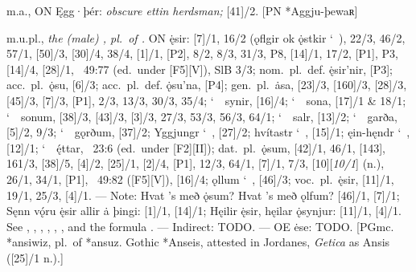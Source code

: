 \begin{itemize}
 m.a., ON Ęgg·þér:
  \emph{obscure ettin herdsman;} [41]/2.
  [PN *Aggju-þewaʀ]

 m.u.pl.,
  \emph{the (male) , pl.~of .}
  ON ę̇sir: [7]/1, 16/2 (ǫflgir ok ǫ̇stkir \char`~), 22/3, 46/2, 57/1, [50]/3, [30]/4, 38/4, [1]/1, [P2], 8/2, 8/3, 31/3, P8, [14]/1, 17/2, [P1], P3, [14]/4, [28]/1, \Gylfaginning~49:77 (ed.~under [F5][V]), SlB 3/3;
  nom.~pl.~def. ę̇sir’nir, [P3];
  acc.~pl.~ǫ̇su, [6]/3;
  acc.~pl.~def. ǫ̇su’na, [P4];
  gen.~pl.~ȧsa, [23]/3, [160]/3, [28]/3, [45]/3, [7]/3, [P1], 2/3, 13/3, 30/3, 35/4;
  \char`~\ synir, [16]/4;
  \char`~\ sona, [17]/1 \& 18/1;
  \char`~\ sonum, [38]/3, [43]/3, [3]/3, 27/3, 53/3, 56/3, 64/1;
  \char`~\ salr, [13]/2;
  \char`~\ garða, [5]/2, 9/3;
  \char`~\ gǫrðum, [37]/2;
  Yggjungr \char`~, [27]/2;
  hvítastr \char`~, [15]/1;
  ęin-hęndr \char`~, [12]/1;
  \char`~\ ę́ttar, \Gylfaginning~23:6 (ed.~under [F2][II]);
  dat.~pl.~ǫ̇sum, [42]/1, 46/1, [143], 161/3, [38]/5, [4]/2, [25]/1, [2]/4, [P1], 12/3, 64/1, [7]/1, 7/3, [10][\emph{10/1}] (n.), 26/1, 34/1, [P1],
  \Gylfaginning~49:82 ([F5][V]), [16]/4;
  ǫllum \char`~, [46]/3;
  voc.~pl.~ę̇sir, [11]/1, 19/1, 25/3, [4]/1.
  --- Note: Hvat ’s með ǫ̇sum? Hvat ’s með ǫlfum? [46]/1, [7]/1; Sęnn vǫ́ru ę̇sir allir ȧ þingi: [1]/1, [14]/1; Hęilir ę̇sir, hęilar ǫ̇synjur: [11]/1, [4]/1.
  See , , , , , , and the formula .
  --- Indirect: TODO.
  --- OE ėse: TODO.
  [PGmc. *ansiwiz, pl.~of *ansuz.  Gothic *Anseis, attested in Jordanes, \emph{Getica} as Ansis ([25]/1 n.).]


\end{itemize}
